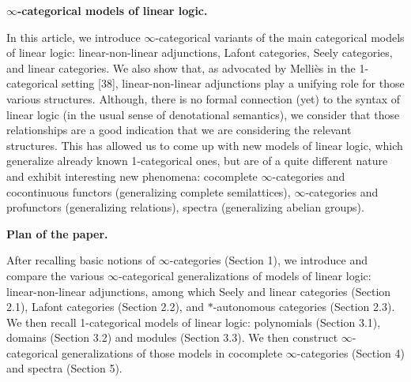 \documentclass[10pt,a4paper]{article}
\begin{document}
 
 
 
\par\medskip\noindent\textbf{$\infty$-categorical models of linear logic.}\par
 
 
In this article, we introduce $\infty$-categorical variants of the main categorical models of linear logic: linear-non-linear adjunctions, Lafont categories, Seely categories, and linear categories. We also show that, as advocated by Melliès in the 1-categorical setting [38], linear-non-linear adjunctions play a unifying role for those various structures. Although, there is no formal connection (yet) to the syntax of linear logic (in the usual sense of denotational semantics), we consider that those relationships are a good indication that we are considering the relevant structures. This has allowed us to come up with new models of linear logic, which generalize already known 1-categorical ones, but are of a quite different nature and exhibit interesting new phenomena: cocomplete $\infty$-categories and cocontinuous functors (generalizing complete semilattices), $\infty$-categories and profunctors (generalizing relations), spectra (generalizing abelian groups).\par
 
 
 
 
\par\medskip\noindent\textbf{Plan of the paper.}\par
 
 
After recalling basic notions of $\infty$-categories (Section 1), we introduce and compare the various $\infty$-categorical generalizations of models of linear logic: linear-non-linear adjunctions, among which Seely and linear categories (Section 2.1), Lafont categories (Section 2.2), and $*$-autonomous categories (Section 2.3). We then recall 1-categorical models of linear logic: polynomials (Section 3.1), domains (Section 3.2) and modules (Section 3.3). We then construct $\infty$-categorical generalizations of those models in cocomplete $\infty$-categories (Section 4) and spectra (Section 5).\par
 
\end{document}
